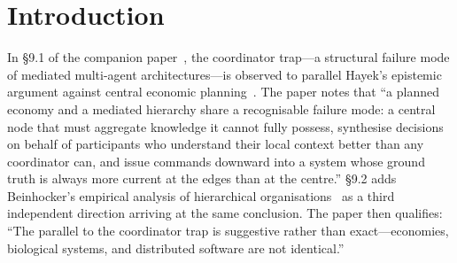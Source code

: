 \documentclass[11pt]{article}
\theoremstyle{definition}
\theoremstyle{plain}
\theoremstyle{plain}
\begin{document}
\begin{abstract}
a measurement on a single substrate in which broker-mediated decisions
exhibit mean latency thirty to a hundred times higher (one to two orders of
magnitude) than locally evaluated ones (the within-paradigm gradient the theorem predicts), and a
constructive pull instantiation---a tuple-space layer built entirely from
the substrate's public primitives---whose test suite verifies exactly-once-effect
distribution with no participant holding a view of any other's state, and
survival of the rendezvous point itself through emergent, coordinator-free
failover. We close with an
honest accounting of the open questions:
the formal status of the theorem, the boundary conditions of the HLKS model,
the Holland/Burgess tension, and the further structural properties that
correctness against external and internal capture would require---properties
that are the subject of a companion paper currently in preparation.
\end{abstract}

\section{Introduction}

In \S9.1 of the companion paper~\cite{nicholson2026}, the coordinator trap---a
structural failure mode of mediated multi-agent architectures---is observed to
parallel Hayek's epistemic argument against central economic
planning~\cite{hayek1945}. The paper notes that ``a planned economy and a
mediated hierarchy share a recognisable failure mode: a central node that must
aggregate knowledge it cannot fully possess, synthesise decisions on behalf of
participants who understand their local context better than any coordinator
can, and issue commands downward into a system whose ground truth is always
more current at the edges than at the centre.'' \S9.2 adds Beinhocker's
empirical analysis of hierarchical organisations~\cite{beinhocker2006} as a
third independent direction arriving at the same conclusion. The paper then
qualifies: ``The parallel to the coordinator trap is suggestive rather than
exact---economies, biological systems, and distributed software are not
identical.''
\end{document}
